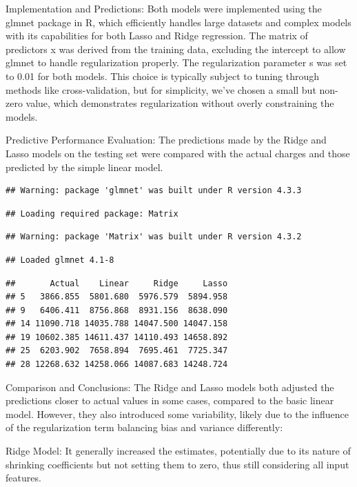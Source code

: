 \documentclass[
  12pt,
]{article}
\begin{document}
Implementation and Predictions: Both models were implemented using the
glmnet package in R, which efficiently handles large datasets and
complex models with its capabilities for both Lasso and Ridge
regression. The matrix of predictors x was derived from the training
data, excluding the intercept to allow glmnet to handle regularization
properly. The regularization parameter s was set to 0.01 for both
models. This choice is typically subject to tuning through methods like
cross-validation, but for simplicity, we've chosen a small but non-zero
value, which demonstrates regularization without overly constraining the
models.

Predictive Performance Evaluation: The predictions made by the Ridge and
Lasso models on the testing set were compared with the actual charges
and those predicted by the simple linear model.

\begin{verbatim}
## Warning: package 'glmnet' was built under R version 4.3.3
\end{verbatim}

\begin{verbatim}
## Loading required package: Matrix
\end{verbatim}

\begin{verbatim}
## Warning: package 'Matrix' was built under R version 4.3.2
\end{verbatim}

\begin{verbatim}
## Loaded glmnet 4.1-8
\end{verbatim}

\begin{verbatim}
##       Actual    Linear     Ridge     Lasso
## 5   3866.855  5801.680  5976.579  5894.958
## 9   6406.411  8756.868  8931.156  8638.090
## 14 11090.718 14035.788 14047.500 14047.158
## 19 10602.385 14611.437 14110.493 14658.892
## 25  6203.902  7658.894  7695.461  7725.347
## 28 12268.632 14258.066 14087.683 14248.724
\end{verbatim}

Comparison and Conclusions: The Ridge and Lasso models both adjusted the
predictions closer to actual values in some cases, compared to the basic
linear model. However, they also introduced some variability, likely due
to the influence of the regularization term balancing bias and variance
differently:

Ridge Model: It generally increased the estimates, potentially due to
its nature of shrinking coefficients but not setting them to zero, thus
still considering all input features.
\end{document}

